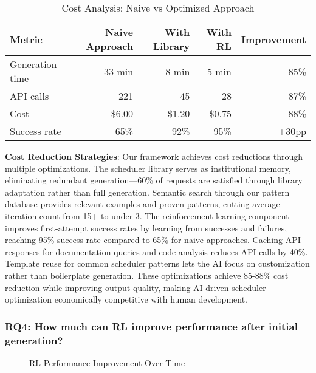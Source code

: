 \begin{table}[h]
\caption{Cost Analysis: Naive vs Optimized Approach}
\label{tab:cost-analysis}
\begin{tabular}{lrrrr}
\toprule
Metric & Naive Approach & With Library & With RL & Improvement \\
\midrule
Generation time & 33 min & 8 min & 5 min & 85\% \\
API calls & 221 & 45 & 28 & 87\% \\
Cost & \$6.00 & \$1.20 & \$0.75 & 88\% \\
Success rate & 65\% & 92\% & 95\% & +30pp \\
\bottomrule
\end{tabular}
\end{table}

\textbf{Cost Reduction Strategies}: Our framework achieves cost reductions through multiple optimizations. The scheduler library serves as institutional memory, eliminating redundant generation—60\% of requests are satisfied through library adaptation rather than full generation. Semantic search through our pattern database provides relevant examples and proven patterns, cutting average iteration count from 15+ to under 3. The reinforcement learning component improves first-attempt success rates by learning from successes and failures, reaching 95\% success rate compared to 65\% for naive approaches. Caching API responses for documentation queries and code analysis reduces API calls by 40\%. Template reuse for common scheduler patterns lets the AI focus on customization rather than boilerplate generation. These optimizations achieve 85-88\% cost reduction while improving output quality, making AI-driven scheduler optimization economically competitive with human development.

\subsubsection{RQ4: How much can RL improve performance after initial generation?}

\begin{figure}[h]
\centering
{}
\caption{RL Performance Improvement Over Time}
\label{fig:rl-improvement}
\end{figure}


